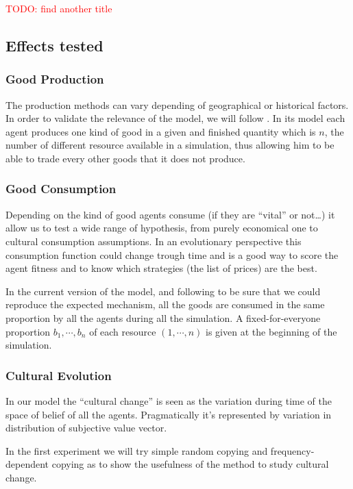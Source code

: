 \documentclass{wscpaperproc}
\newcommand{\memo}[2]{\textcolor{#1}{#2}}
\newcommand{\todo}[1]{\memo{red}{TODO: #1\\}}
\begin{document}
\todo{find another title}
\subsection{Effects tested}

\subsubsection{Good Production}\label{production}
The production methods can vary depending of geographical or historical factors. In order to validate the relevance of the model, we will follow \cite{gintis_emergence_2006}. In its model each agent produces one kind of good in a given and finished quantity which is $n$, the number of different resource available in a simulation, thus allowing him to be able to trade every other goods that it does not produce.

\subsubsection{Good Consumption}\label{consumption}
Depending on the kind of good agents consume (if they are ``vital'' or not\ldots) it allow us to test a wide range of hypothesis, from purely economical one to cultural consumption assumptions.  In an evolutionary perspective this consumption function could change trough time and is a good way to score the agent fitness and to know which strategies (the list of prices) are the best.

In the current version of the model, and following
\cite{gintis_emergence_2006} to be sure that we could reproduce the expected mechanism, all the goods are consumed in the same proportion by all the agents during all the simulation. A fixed-for-everyone proportion $b_1,\cdots,b_n$ of each resource $(1, \cdots, n)$ is given at the beginning of the simulation.

\subsubsection{Cultural Evolution}
In our model the ``cultural change'' is seen as the variation during time of the space of belief of all the agents. Pragmatically it's represented by variation in distribution of subjective value vector.

In the first experiment we will try simple random copying and frequency-dependent copying as \cite{mesoudi_random_2009} to show the usefulness of the method to study cultural change. 
\end{document}
